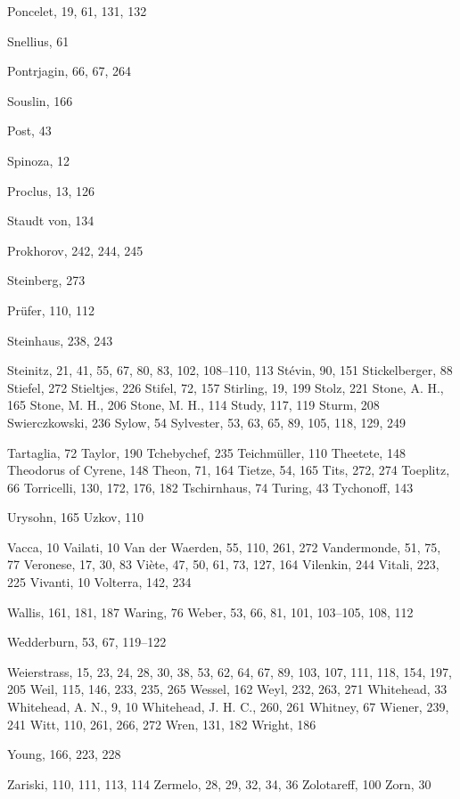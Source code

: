 Poncelet, 19, 61, 131, 132

Snellius, 61

Pontrjagin, 66, 67, 264

Souslin, 166

Post, 43

Spinoza, 12

Proclus, 13, 126

Staudt von, 134

Prokhorov, 242, 244, 245

Steinberg, 273

Prüfer, 110, 112

Steinhaus, 238, 243

Steinitz, 21, 41, 55, 67, 80, 83, 102, 108--110, 113
Stévin, 90, 151
Stickelberger, 88
Stiefel, 272
Stieltjes, 226
Stifel, 72, 157
Stirling, 19, 199
Stolz, 221
Stone, A. H., 165
Stone, M. H., 206
Stone, M. H., 114
Study, 117, 119
Sturm, 208
Swierczkowski, 236
Sylow, 54
Sylvester, 53, 63, 65, 89, 105, 118, 129,
249

Tartaglia, 72
Taylor, 190
Tchebychef, 235
Teichmüller, 110
Theetete, 148
Theodorus of Cyrene, 148
Theon, 71, 164
Tietze, 54, 165
Tits, 272, 274
Toeplitz, 66
Torricelli, 130, 172, 176, 182
Tschirnhaus, 74
Turing, 43
Tychonoff, 143

Urysohn, 165
Uzkov, 110

Vacca, 10
Vailati, 10
Van der Waerden, 55, 110, 261, 272
Vandermonde, 51, 75, 77
Veronese, 17, 30, 83
Viète, 47, 50, 61, 73, 127, 164
Vilenkin, 244
Vitali, 223, 225
Vivanti, 10
Volterra, 142, 234

Wallis, 161, 181, 187
Waring, 76
Weber, 53, 66, 81, 101, 103--105, 108,
112

Wedderburn, 53, 67, 119--122

Weierstrass, 15, 23, 24, 28, 30, 38, 53, 62, 64, 67, 89, 103, 107, 111, 118, 154, 197, 205
Weil, 115, 146, 233, 235, 265
Wessel, 162
Weyl, 232, 263, 271
Whitehead, 33
Whitehead, A. N., 9, 10
Whitehead, J. H. C., 260, 261
Whitney, 67
Wiener, 239, 241
Witt, 110, 261, 266, 272
Wren, 131, 182
Wright, 186

Young, 166, 223, 228

Zariski, 110, 111, 113, 114
Zermelo, 28, 29, 32, 34, 36
Zolotareff, 100
Zorn, 30
